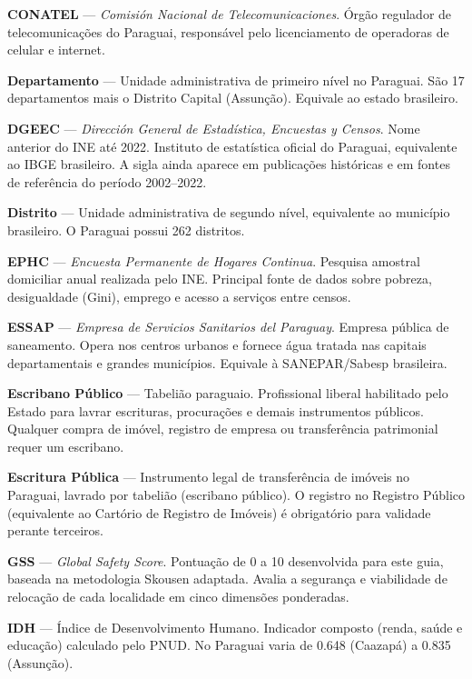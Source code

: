\medskip
\noindent\textbf{CONATEL} — \textit{Comisión Nacional de Telecomunicaciones}. Órgão regulador de telecomunicações do Paraguai, responsável pelo licenciamento de operadoras de celular e internet.

\medskip
\noindent\textbf{Departamento} — Unidade administrativa de primeiro nível no Paraguai. São 17 departamentos mais o Distrito Capital (Assunção). Equivale ao estado brasileiro.

\medskip
\noindent\textbf{DGEEC} — \textit{Dirección General de Estadística, Encuestas y Censos}. Nome anterior do INE até 2022. Instituto de estatística oficial do Paraguai, equivalente ao IBGE brasileiro. A sigla ainda aparece em publicações históricas e em fontes de referência do período 2002--2022.

\medskip
\noindent\textbf{Distrito} — Unidade administrativa de segundo nível, equivalente ao município brasileiro. O Paraguai possui 262 distritos.

\medskip
\noindent\textbf{EPHC} — \textit{Encuesta Permanente de Hogares Continua}. Pesquisa amostral domiciliar anual realizada pelo INE. Principal fonte de dados sobre pobreza, desigualdade (Gini), emprego e acesso a serviços entre censos.

\medskip
\noindent\textbf{ESSAP} — \textit{Empresa de Servicios Sanitarios del Paraguay}. Empresa pública de saneamento. Opera nos centros urbanos e fornece água tratada nas capitais departamentais e grandes municípios. Equivale à SANEPAR/Sabesp brasileira.

\medskip
\noindent\textbf{Escribano Público} — Tabelião paraguaio. Profissional liberal habilitado pelo Estado para lavrar escrituras, procurações e demais instrumentos públicos. Qualquer compra de imóvel, registro de empresa ou transferência patrimonial requer um escribano.

\medskip
\noindent\textbf{Escritura Pública} — Instrumento legal de transferência de imóveis no Paraguai, lavrado por tabelião (escribano público). O registro no Registro Público (equivalente ao Cartório de Registro de Imóveis) é obrigatório para validade perante terceiros.

\medskip
\noindent\textbf{GSS} — \textit{Global Safety Score}. Pontuação de 0 a 10 desenvolvida para este guia, baseada na metodologia Skousen adaptada. Avalia a segurança e viabilidade de relocação de cada localidade em cinco dimensões ponderadas.

\medskip
\noindent\textbf{IDH} — Índice de Desenvolvimento Humano. Indicador composto (renda, saúde e educação) calculado pelo PNUD. No Paraguai varia de 0.648 (Caazapá) a 0.835 (Assunção).

